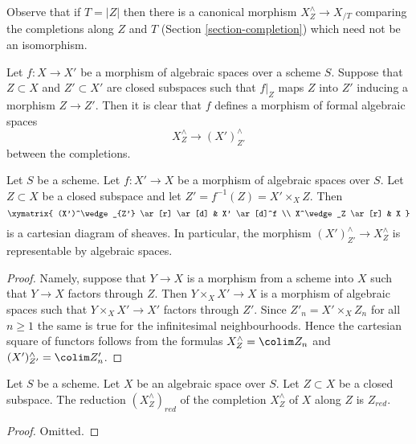 \noindent
Observe that if $T = |Z|$ then there is a canonical morphism
$X^\wedge_Z \to X_{/T}$ comparing the completions along $Z$
and $T$ (Section \ref{section-completion}) which need not be an isomorphism.

\medskip\noindent
Let $f : X \to X'$ be a morphism of algebraic spaces over a scheme $S$.
Suppose that $Z \subset X$ and $Z' \subset X'$ are closed subspaces
such that $f|_Z$ maps $Z$ into $Z'$ inducing a morphism $Z \to Z'$.
Then it is clear that $f$ defines a morphism of formal algebraic spaces
$$
X^\wedge_Z \longrightarrow (X')^\wedge_{Z'}
$$
between the completions.

\begin{lemma}
\label{lemma-map-completions-subspaces-representable}
Let $S$ be a scheme. Let $f : X' \to X$ be a morphism
of algebraic spaces over $S$. Let $Z \subset X$
be a closed subspace and let $Z' = f^{-1}(Z) = X' \times_X Z$.
Then
$$
\xymatrix{
(X')^\wedge_{Z'} \ar[r] \ar[d] & X' \ar[d]^f \\
X^\wedge_Z \ar[r] & X
}
$$
is a cartesian diagram of sheaves. In particular, the morphism
$(X')^\wedge_{Z'} \to X^\wedge_Z$ is representable by algebraic spaces.
\end{lemma}

\begin{proof}
Namely, suppose that $Y \to X$ is a morphism from a scheme into $X$ such
that $Y \to X$ factors through $Z$. Then $Y \times_X X' \to X$
is a morphism of algebraic spaces such that $Y \times_X X' \to X'$
factors through $Z'$. Since $Z'_n = X' \times_X Z_n$ for all $n \geq 1$
the same is true for the infinitesimal neighbourhoods.
Hence the cartesian square of functors follows
from the formulas $X^\wedge_Z = \colim Z_n$ and
$(X')^\wedge_{Z'} = \colim Z'_n$.
\end{proof}

\begin{lemma}
\label{lemma-reduction-completion-subspace}
Let $S$ be a scheme. Let $X$ be an algebraic space over $S$.
Let $Z \subset X$ be a closed subspace. The reduction $(X^\wedge_Z)_{red}$
of the completion $X^\wedge_Z$ of $X$ along $Z$ is $Z_{red}$.
\end{lemma}

\begin{proof}
Omitted.
\end{proof}

